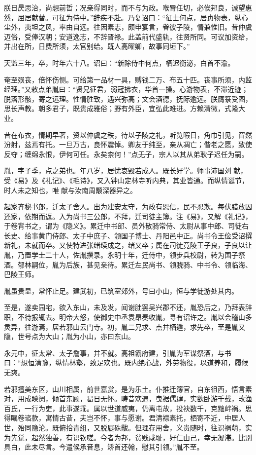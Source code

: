 \documentclass[12pt,UTF8]{ctexbook}
\begin{document}
朕日昃思治，尚想前哲；况亲得同时，而不与为政。喉脣任切，必俟邦良，诚望惠然，屈居献替。可征为侍中。”辞疾不赴。乃复诏曰：“征士何点，居贞物表，纵心尘外，夷坦之风，率由自远。往因素志，颇申宴言，眷彼子陵，情兼惟旧。昔仲虞迈俗，受俸汉朝；安道逸志，不辞晋禄。此盖前代盛轨，往贤所同。可议加资给，并出在所，日费所须，太官别给。既人高曜卿，故事同垣下。”

天监三年，卒，时年六十八。诏曰：“新除侍中何点，栖迟衡泌，白首不渝。

奄至殒丧，倍怀伤恻。可给第一品材一具，赙钱二万、布五十匹。丧事所须，内监经理。”又敕点弟胤曰：“贤兄征君，弱冠拂衣，华首一操。心游物表，不滞近迹；脱落形骸，寄之远理。性情胜致，遇兴弥高；文会酒德，抚际逾远。朕膺箓受图，思长声教。朝多君子，既贵成雅俗；野有外臣，宜弘此难进。方赖清徽，式隆大业。

昔在布衣，情期早著，资以仲虞之秩，待以子陵之礼，听览暇日，角巾引见，窅然汾射，兹焉有托。一旦万古，良怀震悼。卿友于纯至，亲从凋亡；偕老之愿，致使反夺；缠绵永恨，伊何可任。永矣柰何！”点无子，宗人以其从弟耿子迟任为嗣。

胤，字子季，点之弟也。年八岁，居忧哀毁若成人。既长好学。师事沛国刘献，受《易》及《礼记》、《毛诗》，又入钟山定林寺听内典，其业皆通。而纵情诞节，时人未之知也，唯献与汝南周颙深器异之。

起家齐秘书郎，迁太子舍人。出为建安太守，为政有恩信，民不忍欺。每伏腊放囚还家，依期而返。入为尚书三公郎，不拜，迁司徒主簿。注《易》，又解《礼记》，于卷背书之，谓为《隐义》。累迁中书郎、员外散骑常侍、太尉从事中郎、司徒右长史、给事黄门侍郎、太子中庶子、领国子博士、丹阳邑中正。尚书令王俭受诏撰新礼，未就而卒。又使特进张绪续成之，绪又卒；属在司徒竟陵王子良，子良以让胤，乃置学士二十人，佐胤撰录。永明十年，迁侍中，领步兵校尉，转为国子祭酒。郁林嗣位，胤为后族，甚见亲待。累迁左民尚书、领骁骑、中书令、领临海、巴陵王师。

胤虽贵显，常怀止足。建武初，已筑室郊外，号曰小山，恒与学徒游处其内。

至是，遂卖园宅，欲入东山，未及发，闻谢朏罢吴兴郡不还，胤恐后之，乃拜表辞职，不待报辄去。明帝大怒，使御史中丞袁昂奏收胤，寻有诏许之。胤以会稽山多灵异，往游焉，居若邪山云门寺。初，胤二兄求、点并栖遁，求先卒，至是胤又隐，世号点为大山；胤为小山，亦曰东山。

永元中，征太常、太子詹事，并不就。高祖霸府建，引胤为军谋祭酒，与书曰：“想恒清豫，纵情林壑，致足欢也。既内绝心战，外劳物役，以道养和，履候无爽。

若邪擅美东区，山川相属，前世嘉赏，是为乐土。仆推迁簿官，自东徂西，悟言素对，用成睽阕，倾首东顾，曷日无怀。畴昔欢遇，曳裾儒肆，实欲卧游千载，畋渔百氏，一行为吏，此事遂乖。属以世道威夷，仍离屯故，投袂数千，克黜衅祸。思得瞩卷谘款，寓情古昔，夫岂不怀，事与愿谢。君清襟素托，栖寄不近，中居人世，殆同隐沦。既俯拾青组，又脱屣硃黻。但理存用舍，义贵随时，往识祸萌，实为先觉，超然独善，有识钦嗟。今者为邦，贫贱咸耻，好仁由己，幸无凝滞。比别具白，此未尽言。今遣候承音息，矫首还翰，慰其引领。”胤不至。
\end{document}
